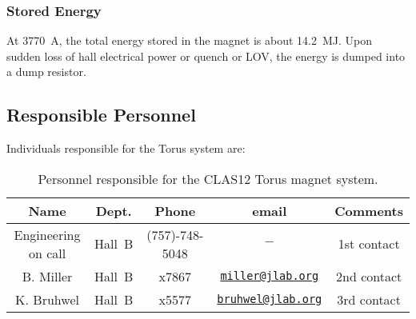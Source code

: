 \subsubsection{Stored Energy}

At 3770~A, the total energy stored in the magnet is about 14.2~MJ. Upon sudden loss of hall 
electrical power or quench or LOV, the energy is dumped into a dump resistor.

\subsection{Responsible Personnel}

Individuals responsible for the Torus system are:

\begin{table}[!htb]
\centering
\begin{tabular}{|c|c|c|c|c|} \hline
Name&Dept.&Phone&email&Comments \\ \hline
Engineering on call&Hall~B&(757)-748-5048&$-$& 1st contact \\ \hline
B. Miller &Hall~B& x7867&\href{mailto:miller@jlab.org}{\nolinkurl{miller@jlab.org}}&2nd contact\\ \hline
K. Bruhwel&Hall~B & x5577&\href{mailto:}{\nolinkurl{bruhwel@jlab.org}}&3rd contact \\ \hline
\end{tabular}
\caption{Personnel responsible for the CLAS12 Torus magnet system.} 
\label{tb:torus}
\end{table}

